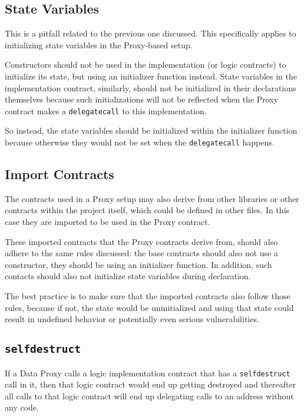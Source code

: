\subsection{State Variables}\label{state-variables}

This is a pitfall related to the previous one discussed. This
specifically applies to initializing state variables in the Proxy-based
setup.

Constructors should not be used in the implementation (or logic
contracts) to initialize its state, but using an initializer function
instead. State variables in the implementation contract, similarly,
should not be initialized in their declarations themselves because such
initializations will not be reflected when the Proxy contract makes a
\texttt{delegatecall} to this implementation.

So instead, the state variables should be initialized within the
initializer function because otherwise they would not be set when the
\texttt{delegatecall} happens.

\subsection{Import Contracts}\label{import-contracts}

The contracts used in a Proxy setup may also derive from other libraries
or other contracts within the project itself, which could be defined in
other files. In this case they are imported to be used in the Proxy
contract.

These imported contracts that the Proxy contracts derive from, should
also adhere to the same rules discussed: the base contracts should also
not use a constructor, they should be using an initializer function. In
addition, such contacts should also not initialize state variables
during declaration.

The best practice is to make sure that the imported contracts also
follow those rules, because if not, the state would be uninitialized and
using that state could result in undefined behavior or potentially even
serious vulnerabilities.

\subsection{\texorpdfstring{\texttt{selfdestruct}}{selfdestruct}}\label{selfdestruct}

If a Data Proxy calls a logic implementation contract that has a
\texttt{selfdestruct} call in it, then that logic contract would end up
getting destroyed and thereafter all calls to that logic contract will
end up delegating calls to an address without any code.

